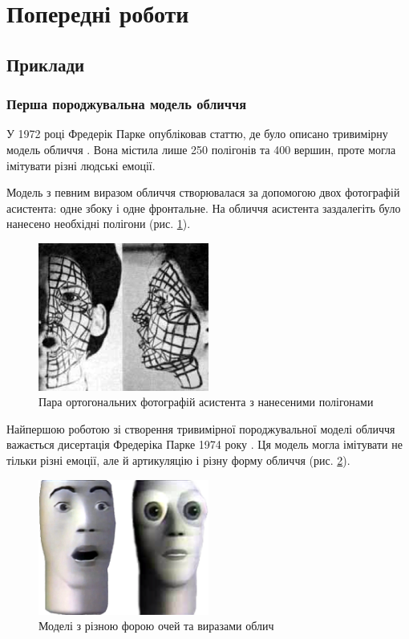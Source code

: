 \section{Попередні роботи}

\subsection{Приклади}

\subsubsection{Перша породжувальна модель обличчя}

У 1972 році Фредерік Парке опубліковав статтю,
де було описано тривимірну модель обличчя \cite{Parke:1972}.
Вона містила лише 250 полігонів та 400 вершин,
проте могла імітувати різні людські емоції.

Модель з певним виразом обличчя створювалася за допомогою
двох фотографій асистента: одне збоку і одне фронтальне.
На обличчя асистента заздалегіть було нанесено необхідні полігони
(рис. \ref{fig:parke:face-paint}).
\begin{figure}[h]
  \centering
    \includegraphics[width=0.5\textwidth]{images/Parke-face-paint}
  \caption{Пара ортогональних фотографій асистента з нанесеними полігонами}
  \label{fig:parke:face-paint}
\end{figure}

Найпершою роботою зі створення
тривимірної породжувальної моделі обличчя важається
дисертація Фредеріка Парке 1974 року \cite{Parke:1974}.
Ця модель могла імітувати не тільки різні емоції,
але й артикуляцію і різну форму обличчя
(рис. \ref{fig:parke:face-models}).
\begin{figure}[h]
  \centering
    \includegraphics[width=0.5\textwidth]{images/Parke-faces}
  \caption{Моделі з різною форою очей та виразами облич}
  \label{fig:parke:face-models}
\end{figure}

